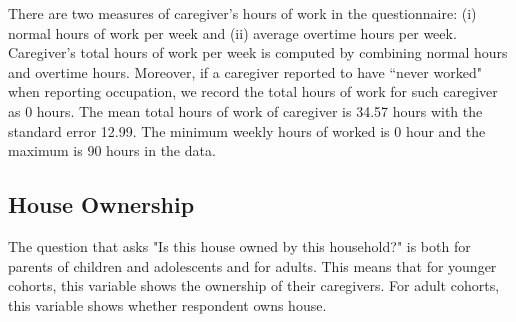 There are two measures of caregiver's hours of work in the questionnaire: (i) normal hours of work per week and (ii) average overtime hours per week. Caregiver's total hours of work per week is computed by combining normal hours and overtime hours. Moreover, if a caregiver reported to have ``never worked" when reporting occupation, we record the total hours of work for such caregiver as 0 hours. The mean total hours of work of caregiver is  34.57 hours with the standard error 12.99. The minimum weekly hours of worked is 0 hour and the maximum is 90 hours in the data.

\subsection{House Ownership}
The question that asks "Is this house owned by this household?" is both for parents of children and adolescents and for adults. This means that for younger cohorts, this variable shows the ownership of their caregivers. For adult cohorts, this variable shows whether respondent owns house. 
